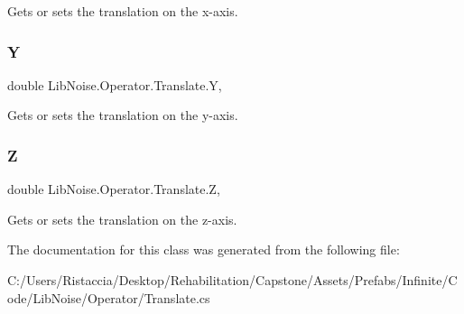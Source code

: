 Gets or sets the translation on the x-\/axis. 

\mbox{\label{class_lib_noise_1_1_operator_1_1_translate_a9c9152d3694904bc41131c74808a5c71}} 
\subsubsection{\texorpdfstring{Y}{Y}}
{\footnotesize\ttfamily double Lib\+Noise.\+Operator.\+Translate.\+Y\hspace{0.3cm}{\ttfamily [get]}, {\ttfamily [set]}}



Gets or sets the translation on the y-\/axis. 

\mbox{\label{class_lib_noise_1_1_operator_1_1_translate_a30fa2c1df3b8b33ad460c877aabfc9c8}} 
\subsubsection{\texorpdfstring{Z}{Z}}
{\footnotesize\ttfamily double Lib\+Noise.\+Operator.\+Translate.\+Z\hspace{0.3cm}{\ttfamily [get]}, {\ttfamily [set]}}



Gets or sets the translation on the z-\/axis. 



The documentation for this class was generated from the following file\+:\begin{DoxyCompactItemize}
\item 
C\+:/\+Users/\+Ristaccia/\+Desktop/\+Rehabilitation/\+Capstone/\+Assets/\+Prefabs/\+Infinite/\+Code/\+Lib\+Noise/\+Operator/Translate.\+cs\end{DoxyCompactItemize}
